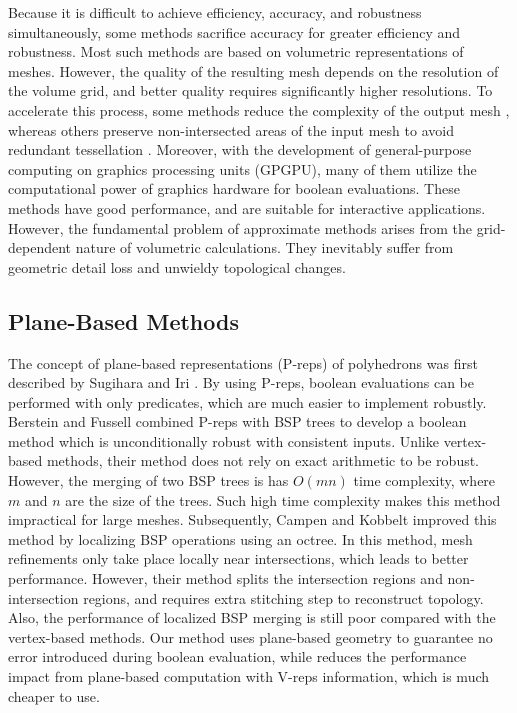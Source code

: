 Because it is difficult to achieve efficiency, accuracy, and robustness simultaneously, some methods sacrifice accuracy for greater efficiency and robustness. Most such methods are based on volumetric representations of meshes. However, the quality of the resulting mesh depends on the resolution of the volume grid, and better quality requires significantly higher resolutions.
To accelerate this process, some methods reduce the complexity of the output mesh \cite{varadhan2004topology}, whereas others preserve non-intersected areas of the input mesh to avoid redundant tessellation \cite{pavic2010hybrid,wang2011approximate,zhao2011parallel,hable2005blister,ogayar2006gpu,updegrove2016boolean}.
Moreover, with the development of general-purpose computing on graphics processing units (GPGPU), many of them utilize the computational power of graphics hardware for boolean evaluations. These methods have good performance, and are suitable for interactive applications. However, the fundamental problem of approximate methods arises from the grid-dependent nature of volumetric calculations. They inevitably suffer from geometric detail loss and unwieldy topological changes.


\subsection{Plane-Based Methods}
\label{sec:pbrelated}

The concept of plane-based representations (P-reps) of polyhedrons was first described by Sugihara and Iri \cite{sugihara1990solid}. By using P-reps, boolean evaluations can be performed with only predicates, which are much easier to implement robustly. Berstein and Fussell \cite{bernstein2009fast} combined P-reps with BSP trees \cite{thibault1987set,naylor1990merging} to develop a boolean method which is unconditionally robust with consistent inputs. Unlike vertex-based methods, their method does not rely on exact arithmetic to be robust.
However, the merging of two BSP trees is has $O(mn)$ time complexity, where $m$ and $n$ are the size of the trees. Such high time complexity makes this method impractical for large meshes. Subsequently, Campen and Kobbelt \cite{campen2010exact} improved this method by localizing BSP operations using an octree. In this method, mesh refinements only take place locally near intersections, which leads to better performance. However, their method splits the intersection regions and non-intersection regions, and requires extra stitching step to reconstruct topology. Also, the performance of localized BSP merging is still poor compared with the vertex-based methods. Our method uses plane-based geometry to guarantee no error introduced during boolean evaluation, while reduces the performance impact from plane-based computation with V-reps information, which is much cheaper to use.
